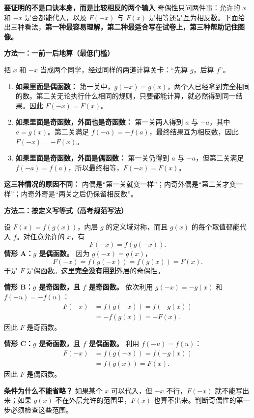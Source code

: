 \clearpage
\begin{proofbox}
\textbf{\textcolor{CProof}{要证明的不是口诀本身，而是比较相反的两个输入}}
奇偶性只问两件事：允许的 $x$ 和 $-x$ 是否都能代入，以及 $F(-x)$ 与 $F(x)$ 是相等还是互为相反数。下面给出三种看法，\textbf{第一种最容易理解，第二种最适合写在试卷上，第三种帮助记住图像。}

\medskip
\textbf{\textcolor{CProof}{方法一：一前一后地算（最低门槛）}}


把 $x$ 和 $-x$ 当成两个同学，经过同样的两道计算关卡：“先算 $g$，后算 $f$”。
\begin{enumerate}[leftmargin=2em,itemsep=0.35em]
\item \textbf{如果里面是偶函数：} 第一关中，$g(-x)=g(x)$，两个人已经拿到完全相同的数。第二关无论执行什么相同的规则，只要都能计算，就必然得到同一结果。因此 $F(-x)=F(x)$。
\item \textbf{如果里面是奇函数，外面也是奇函数：} 第一关两人得到 $a$ 与 $-a$，其中 $a=g(x)$。第二关满足 $f(-a)=-f(a)$，最终结果互为相反数，因此 $F(-x)=-F(x)$。
\item \textbf{如果里面是奇函数，外面是偶函数：} 第一关仍得到 $a$ 与 $-a$，但第二关满足 $f(-a)=f(a)$，所以最终相等，$F(-x)=F(x)$。
\end{enumerate}
\textbf{这三种情况的原因不同：} 内偶是“第一关就变一样”；内奇外偶是“第二关才变一样”；内奇外奇是“两关之后仍保留相反数”。

\medskip

\end{proofbox}
\clearpage
\begin{proofbox}
\textbf{\textcolor{CProof}{方法二：按定义写等式（高考规范写法）}}


设 $F(x)=f(g(x))$，内层 $g$ 的定义域对称，而且 $g(x)$ 的每个取值都能代入 $f$。对任意允许的 $x$，有
\[
F(-x)=f(g(-x)).
\]
\textbf{情形 A：$g$ 是偶函数。} 因为 $g(-x)=g(x)$，
\[
F(-x)=f(g(-x))=f(g(x))=F(x).
\]
于是 $F$ 是偶函数。这里\textbf{完全没有用到}外层的奇偶性。

\textbf{情形 B：$g$ 是奇函数，且 $f$ 是奇函数。} 依次利用 $g(-x)=-g(x)$ 和 $f(-u)=-f(u)$：
\[
\begin{aligned}
F(-x)&=f(g(-x))=f(-g(x))\\
&=-f(g(x))=-F(x).
\end{aligned}
\]
因此 $F$ 是奇函数。

\textbf{情形 C：$g$ 是奇函数，且 $f$ 是偶函数。} 利用 $f(-u)=f(u)$：
\[
\begin{aligned}
F(-x)&=f(g(-x))=f(-g(x))\\
&=f(g(x))=F(x).
\end{aligned}
\]
因此 $F$ 是偶函数。

\textbf{条件为什么不能省略？} 如果某个 $x$ 可以代入，但 $-x$ 不行，$F(-x)$ 就不能写出来；如果 $g(x)$ 不在外层允许的范围里，$F(x)$ 也算不出来。判断奇偶性的第一步必须检查这些范围。

\medskip

\end{proofbox}
